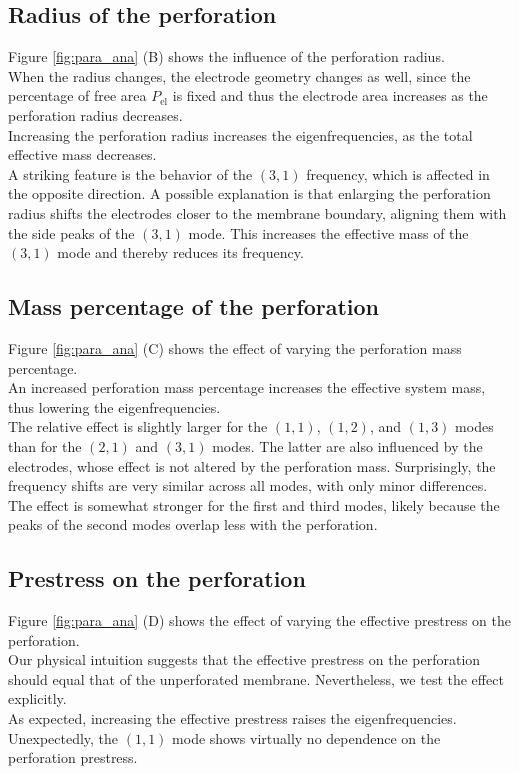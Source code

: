 \subsection{Radius of the perforation}
Figure \ref{fig:para_ana} (B) shows the influence of the perforation radius.\\
When the radius changes, the electrode geometry changes as well, since the percentage of free area $P_\mathrm{el}$ is fixed and thus the electrode area increases as the perforation radius decreases.\\
Increasing the perforation radius increases the eigenfrequencies, as the total effective mass decreases.\\
A striking feature is the behavior of the $(3,1)$ frequency, which is affected in the opposite direction. A possible explanation is that enlarging the perforation radius shifts the electrodes closer to the membrane boundary, aligning them with the side peaks of the $(3,1)$ mode. This increases the effective mass of the $(3,1)$ mode and thereby reduces its frequency.\\

\subsection{Mass percentage of the perforation}
Figure \ref{fig:para_ana} (C) shows the effect of varying the perforation mass percentage.\\
An increased perforation mass percentage increases the effective system mass, thus lowering the eigenfrequencies.\\
The relative effect is slightly larger for the $(1,1)$, $(1,2)$, and $(1,3)$ modes than for the $(2,1)$ and $(3,1)$ modes. The latter are also influenced by the electrodes, whose effect is not altered by the perforation mass. Surprisingly, the frequency shifts are very similar across all modes, with only minor differences.\\
The effect is somewhat stronger for the first and third modes, likely because the peaks of the second modes overlap less with the perforation.\\

\subsection{Prestress on the perforation}
Figure \ref{fig:para_ana} (D) shows the effect of varying the effective prestress on the perforation.\\
Our physical intuition suggests that the effective prestress on the perforation should equal that of the unperforated membrane. Nevertheless, we test the effect explicitly.\\
As expected, increasing the effective prestress raises the eigenfrequencies.\\
Unexpectedly, the $(1,1)$ mode shows virtually no dependence on the perforation prestress.\\

